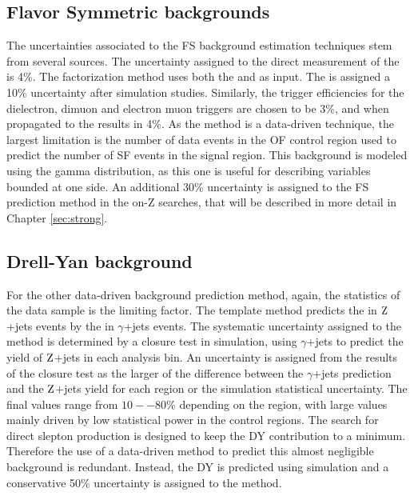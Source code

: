 \subsection*{Flavor Symmetric backgrounds}
\noindent\justify
The uncertainties associated to the FS background estimation techniques stem from several sources.
The uncertainty assigned to the direct measurement of the \Rsfof is 4\%. 
The factorization method uses both the \rmue and \RT as input. 
The \rmue is assigned a 10\% uncertainty after simulation studies.  
Similarly, the trigger efficiencies for the dielectron, dimuon and electron muon triggers are chosen to be 3\%, and when propagated to the \RT results in 4\%.   
As the method is a data-driven technique, the largest limitation is the number of data events in the OF control region used to predict the number of SF events in the signal region. 
This background is modeled using the gamma distribution, as this one is useful for describing variables bounded at one side.  
An additional 30\% uncertainty is assigned to the FS prediction method in the on-Z searches, that will be described in more detail in Chapter \ref{sec:strong}. 
\subsection*{Drell-Yan background}
\noindent\justify
For the other data-driven background prediction method, again, the statistics of the data sample is the limiting factor.
The \ptmiss template method predicts the \ptmiss in $\mathrm{Z}$+jets events by the \ptmiss in $\gamma$+jets events. 
The systematic uncertainty assigned to the method is determined by a closure test in simulation, using $\gamma$+jets to predict the yield of $\mathrm{Z}$+jets in each analysis bin. 
An uncertainty is assigned from the results of the closure test as the larger of the difference between the $\gamma$+jets prediction and the $\mathrm{Z}$+jets yield for each \ptmiss region or the simulation statistical uncertainty.  
The final values range from $10--80\%$ depending on the region, with large values mainly driven by low statistical power in the control regions.  
\newpara
\noindent\justify
The search for direct slepton production is designed to keep the DY contribution to a minimum. 
Therefore the use of a data-driven method to predict this almost negligible background is redundant. 
Instead, the DY is predicted using simulation and a conservative 50\% uncertainty is assigned to the method.  
